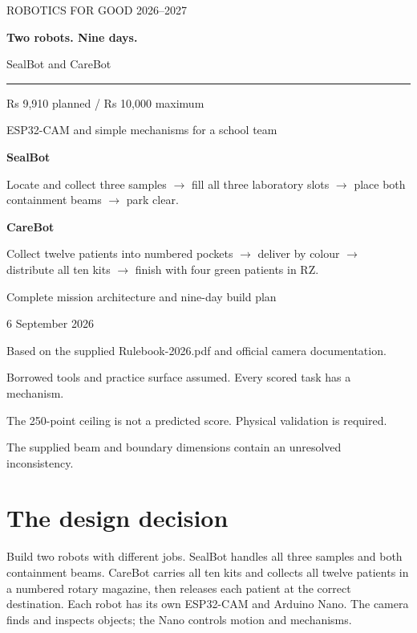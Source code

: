 \documentclass[10pt,a4paper]{article}
\begin{document}
\hypersetup{pageanchor=false}
\begin{titlepage}
\color{ink}
\vspace*{20mm}
{\large ROBOTICS FOR GOOD 2026--2027\par}
\vspace{9mm}
{\Huge\bfseries Two robots. Nine days.\par}
\vspace{7mm}
{\Large SealBot and CareBot\par}
\vspace{12mm}
\rule{\linewidth}{1pt}
\vspace{8mm}
{\large Rs 9,910 planned / Rs 10,000 maximum\par}
{\large ESP32-CAM and simple mechanisms for a school team\par}
\vspace{12mm}
\textbf{SealBot}\par
Locate and collect three samples $\rightarrow$ fill all three laboratory slots
$\rightarrow$ place both containment beams $\rightarrow$ park clear.\par
\vspace{6mm}
\textbf{CareBot}\par
Collect twelve patients into numbered pockets $\rightarrow$ deliver by colour
$\rightarrow$ distribute all ten kits $\rightarrow$ finish with four green patients in RZ.\par
\vfill
\color{black}
Complete mission architecture and nine-day build plan\par
6 September 2026\par
Based on the supplied Rulebook-2026.pdf and official camera documentation.\par
Borrowed tools and practice surface assumed. Every scored task has a mechanism.\par
The 250-point ceiling is not a predicted score. Physical validation is required.\par
The supplied beam and boundary dimensions contain an unresolved inconsistency.
\end{titlepage}
\hypersetup{pageanchor=true}
\tableofcontents
\clearpage
{}
\section{The design decision}
Build two robots with different jobs. SealBot handles all three samples and both containment beams. CareBot carries all ten kits and collects all twelve patients in a numbered rotary magazine, then releases each patient at the correct destination. Each robot has its own ESP32-CAM and Arduino Nano. The camera finds and inspects objects; the Nano controls motion and mechanisms.
\end{document}
